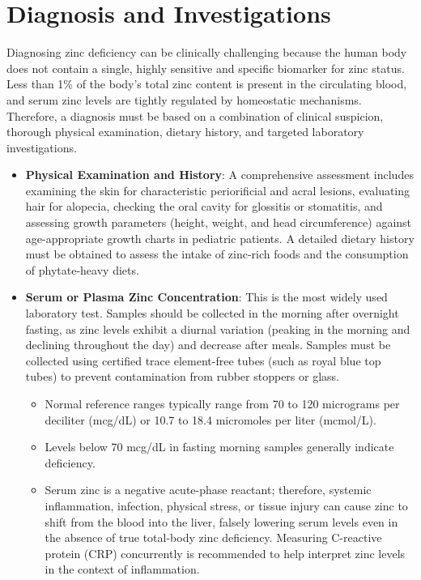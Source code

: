 \section*{Diagnosis and Investigations}
Diagnosing zinc deficiency can be clinically challenging because the human body does not contain a single, highly sensitive and specific biomarker for zinc status. Less than 1\% of the body's total zinc content is present in the circulating blood, and serum zinc levels are tightly regulated by homeostatic mechanisms. Therefore, a diagnosis must be based on a combination of clinical suspicion, thorough physical examination, dietary history, and targeted laboratory investigations.
\begin{itemize}
    \item \textbf{Physical Examination and History}: A comprehensive assessment includes examining the skin for characteristic periorificial and acral lesions, evaluating hair for alopecia, checking the oral cavity for glossitis or stomatitis, and assessing growth parameters (height, weight, and head circumference) against age-appropriate growth charts in pediatric patients. A detailed dietary history must be obtained to assess the intake of zinc-rich foods and the consumption of phytate-heavy diets.
    \item \textbf{Serum or Plasma Zinc Concentration}: This is the most widely used laboratory test. Samples should be collected in the morning after overnight fasting, as zinc levels exhibit a diurnal variation (peaking in the morning and declining throughout the day) and decrease after meals. Samples must be collected using certified trace element-free tubes (such as royal blue top tubes) to prevent contamination from rubber stoppers or glass.
    \begin{itemize}
        \item Normal reference ranges typically range from 70 to 120 micrograms per deciliter (mcg/dL) or 10.7 to 18.4 micromoles per liter (mcmol/L).
        \item Levels below 70 mcg/dL in fasting morning samples generally indicate deficiency.
        \item Serum zinc is a negative acute-phase reactant; therefore, systemic inflammation, infection, physical stress, or tissue injury can cause zinc to shift from the blood into the liver, falsely lowering serum levels even in the absence of true total-body zinc deficiency. Measuring C-reactive protein (CRP) concurrently is recommended to help interpret zinc levels in the context of inflammation.

\end{itemize}
\end{itemize}
